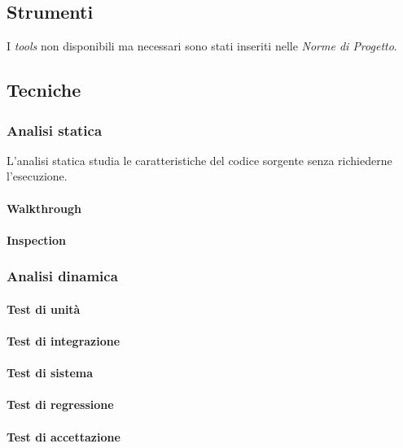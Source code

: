 	\subsection{Strumenti}
		I \emph{tools} non disponibili ma necessari sono stati inseriti nelle \emph{Norme di Progetto}. %
	
	\subsection{Tecniche}
		\subsubsection{Analisi statica}
		L'analisi statica studia le caratteristiche del codice sorgente senza richiederne l'esecuzione.  
			\paragraph{Walkthrough}
			\paragraph{Inspection}
		\subsubsection{Analisi dinamica}
			\paragraph{Test di unità}
			\paragraph{Test di integrazione}
			\paragraph{Test di sistema}
			\paragraph{Test di regressione}
			\paragraph{Test di accettazione}
	
